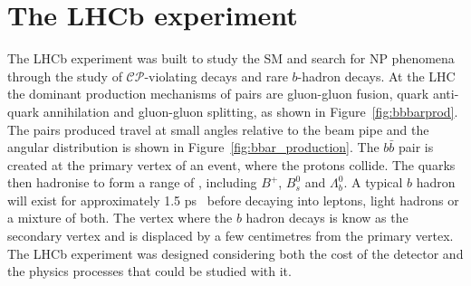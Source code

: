\section{The LHCb experiment}
\label{LHCb}
The LHCb experiment was built to study the SM and search for NP phenomena through the study of $\mathcal{CP}$-violating decays and rare $b$-hadron decays. 
At the LHC the dominant production mechanisms of \bbbar pairs are gluon-gluon fusion, quark anti-quark annihilation and gluon-gluon splitting, as shown in Figure~\ref{fig:bbbarprod}. The \bbbar pairs produced travel at small angles relative to the beam pipe and the angular distribution is shown in Figure~\ref{fig:bbar_production}. %
The $b\bar{b}$ pair is created at the primary vertex of an event, where the protons collide. The quarks then hadronise to form a range of \bhadrons, including $B^{+}$, $B^{0}_{s}$ and $\Lambda^{0}_{b}$. %
A typical $b$ hadron will exist for approximately 1.5 ps~\cite{Olive:2016xmw} before decaying into leptons, light hadrons or a mixture of both. The vertex where the $b$ hadron decays is know as the secondary vertex and is displaced by a few centimetres from the primary vertex. %
The LHCb experiment was designed considering both the cost of the detector and the physics processes that could be studied with it. 



